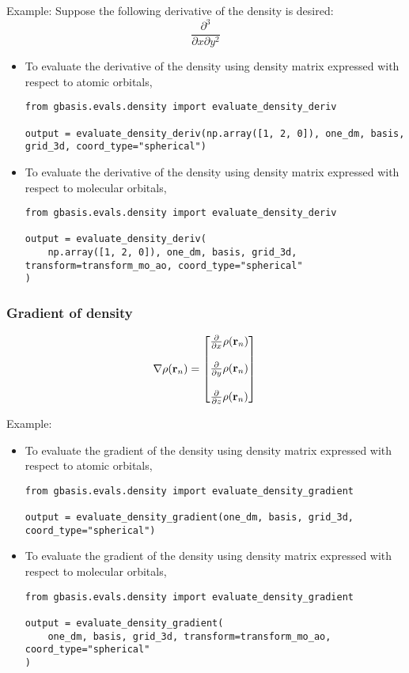 \documentclass[letterpaper]{article}
\begin{document}
Example:
Suppose the following derivative of the density is desired:
\begin{equation}
  \frac{\partial^3}{\partial x \partial y^2}
\end{equation}
\begin{itemize}
\item To evaluate the derivative of the density using density matrix expressed
  with respect to atomic orbitals,
  \begin{lstlisting}[xleftmargin=-25pt]
from gbasis.evals.density import evaluate_density_deriv

output = evaluate_density_deriv(np.array([1, 2, 0]), one_dm, basis, grid_3d, coord_type="spherical")
\end{lstlisting}
\item To evaluate the derivative of the density using density matrix expressed
  with respect to molecular orbitals,
\begin{lstlisting}
from gbasis.evals.density import evaluate_density_deriv

output = evaluate_density_deriv(
    np.array([1, 2, 0]), one_dm, basis, grid_3d, transform=transform_mo_ao, coord_type="spherical"
)
\end{lstlisting}
\end{itemize}
\subsubsection{Gradient of density}
\begin{equation}
  \nabla \rho(\mathbf{r}_n)
  =
  \begin{bmatrix}
    \frac{\partial}{\partial x} \rho(\mathbf{r}_n)\\\\
    \frac{\partial}{\partial y} \rho(\mathbf{r}_n)\\\\
    \frac{\partial}{\partial z} \rho(\mathbf{r}_n)
  \end{bmatrix}\\
\end{equation}

Example:
\begin{itemize}
\item To evaluate the gradient of the density using density matrix expressed
  with respect to atomic orbitals,
  \begin{lstlisting}[xleftmargin=-25pt]
from gbasis.evals.density import evaluate_density_gradient

output = evaluate_density_gradient(one_dm, basis, grid_3d, coord_type="spherical")
\end{lstlisting}
\item To evaluate the gradient of the density using density matrix expressed
  with respect to molecular orbitals,
  \begin{lstlisting}[xleftmargin=-25pt]
from gbasis.evals.density import evaluate_density_gradient

output = evaluate_density_gradient(
    one_dm, basis, grid_3d, transform=transform_mo_ao, coord_type="spherical"
)
\end{lstlisting}
\end{itemize}
\end{document}
